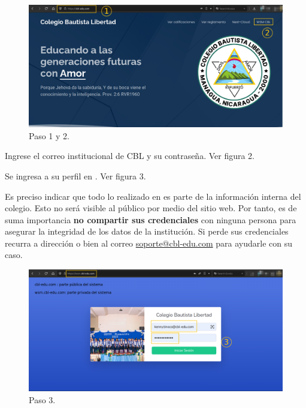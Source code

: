 \documentclass[12pt]{article}
\begin{document}
    \begin{figure}[H]
        \centering
        \includegraphics[width=\textwidth]{image/login.01}
        \caption{Paso 1 y 2.}
        \label{fig:login1}
    \end{figure}

     Ingrese el correo institucional de CBL y su contraseña. Ver figura 2.

     Se ingresa a su perfil en \wsm. Ver figura 3.

    Es preciso indicar que todo lo realizado en \wsm es parte de la información interna del colegio.
    Esto no será visible al público por medio del sitio web.
    Por tanto, es de suma importancia \textbf{no compartir sus credenciales} con ninguna persona para asegurar la integridad de los datos de la institución.
    Si perde sus credenciales recurra a dirección o bien al correo \href{mailto:soporte@cbl-edu.com}{soporte@cbl-edu.com}
    para ayudarle con su caso.

    \begin{figure}[H]
        \centering
        \includegraphics[width=\textwidth]{image/login.02}
        \caption{Paso 3.}
        \label{fig:login2}
    \end{figure}
\end{document}
